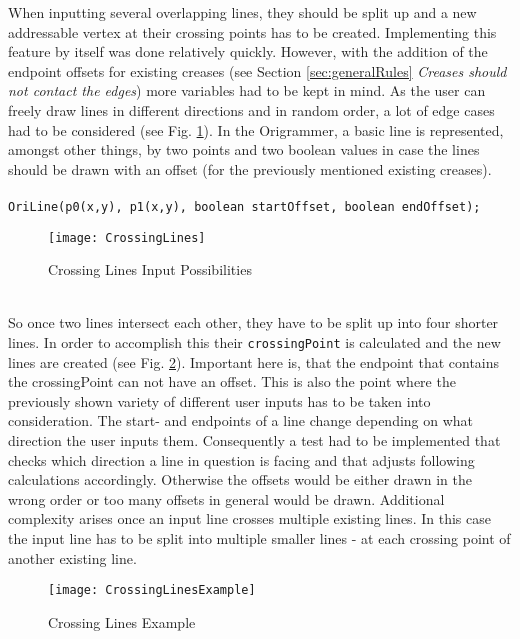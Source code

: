 When inputting several overlapping lines, they should be split up and a new addressable vertex at their crossing points has to be created. Implementing this feature by itself was done relatively quickly. However, with the addition of the endpoint offsets for existing creases (see Section \ref{sec:generalRules} \emph{Creases should not contact the edges}) more variables had to be kept in mind. As the user can freely draw lines in different directions and in random order, a lot of edge cases had to be considered (see Fig. \ref{fig:crossingLines}). In the Origrammer, a basic line is represented, amongst other things,  by two points and two boolean values in case the lines should be drawn with an offset (for the previously mentioned existing creases).\\
\\
\texttt{OriLine(p0(x,y), p1(x,y), boolean startOffset, boolean endOffset);}
\begin{figure}[h]
	\centering
	\texttt{[image: CrossingLines]}
	\caption{Crossing Lines Input Possibilities}
	\label{fig:crossingLines}
\end{figure}\\
So once two lines intersect each other, they have to be split up into four shorter lines. In order to accomplish this their \texttt{crossingPoint} is calculated and the new lines are created (see Fig. \ref{fig:crossingLinesExample}). Important here is, that the endpoint that contains the crossingPoint can not have an offset. This is also the point where the previously shown variety of different user inputs has to be taken into consideration. The start- and endpoints of a line change depending on what direction the user inputs them. Consequently a test had to be implemented that checks which direction a line in question is facing and that adjusts following calculations accordingly. Otherwise the offsets would be either drawn in the wrong order or too many offsets in general would be drawn. Additional complexity arises once an input line crosses multiple existing lines. In this case the input line has to be split into multiple smaller lines - at each crossing point of another existing line.

\begin{figure}[h]
	\centering
	\texttt{[image: CrossingLinesExample]}
	\caption{Crossing Lines Example}
	\label{fig:crossingLinesExample}
\end{figure}

						
